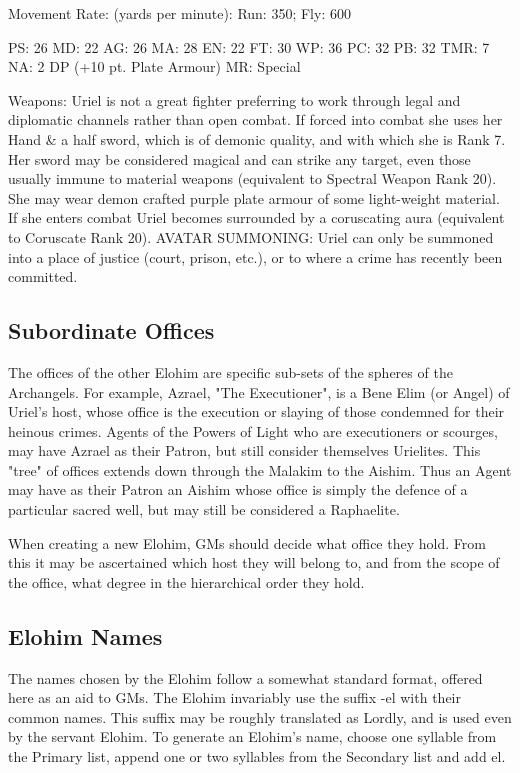 \begin{Description}
Movement Rate: (yards per minute): Run: 350; Fly: 600

PS: 26	MD: 22	AG: 26	MA: 28
EN: 22	FT: 30	WP: 36	PC: 32
PB: 32	TMR: 7	NA: 2 DP (+10 pt. Plate Armour)
MR: Special

Weapons: Uriel is not a great fighter preferring to work through legal and diplomatic channels rather than open combat. If forced into combat she uses her Hand \& a half sword, which is of demonic quality, and with which she is Rank 7. Her sword may be considered magical and can strike any target, even those usually immune to material weapons (equivalent to Spectral Weapon Rank 20). She may wear demon crafted purple plate armour of some light-weight material. If she enters combat Uriel becomes surrounded by a coruscating aura (equivalent to Coruscate Rank 20).
AVATAR SUMMONING: Uriel can only be summoned into a place of justice (court, prison, etc.), or to where a crime has recently been committed. 
\end{Description}

\subsection{Subordinate Offices}

The offices of the other Elohim are specific sub-sets of the spheres of the Archangels.  For example, Azrael, "The Executioner", is a Bene Elim (or Angel) of Uriel's host, whose office is the execution or slaying of those condemned for their heinous crimes. Agents of the Powers of Light who are executioners or scourges, may have Azrael as their Patron, but still consider themselves Urielites. This "tree" of offices extends down through the Malakim to the Aishim. Thus an Agent may have as their Patron an Aishim whose office is simply the defence of a particular sacred well, but may still be considered a Raphaelite.

When creating a new Elohim, GMs should decide what office they hold.  From this it may be ascertained which host they will belong to, and from the scope of the office, what degree in the hierarchical order they hold. 

\subsection{Elohim Names}
The names chosen by the Elohim follow a somewhat standard format, offered here as an aid to GMs.  The Elohim invariably use the suffix -el with their common names.  This suffix may be roughly translated as Lordly, and is used even by the servant Elohim.  To generate an Elohim's name, choose one syllable from the Primary list, append one or two syllables from the Secondary list and add el.

